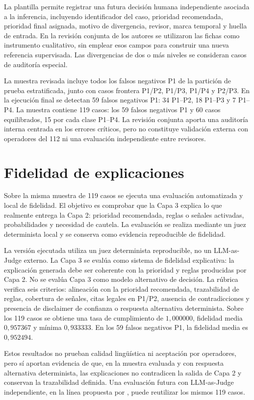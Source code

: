 La plantilla permite registrar una futura decisión humana independiente asociada a la inferencia,
incluyendo identificador del caso, prioridad recomendada, prioridad final asignada,
motivo de divergencia, revisor, marca temporal y huella de entrada. En la revisión conjunta de los autores se utilizaron las fichas como instrumento cualitativo, sin emplear esos campos para construir una nueva referencia supervisada. Las divergencias de dos o más niveles se consideran casos de auditoría especial.

La muestra revisada incluye todos los falsos negativos P1 de la
partición de prueba estratificada, junto con casos frontera P1/P2, P1/P3, P1/P4 y P2/P3. En la
ejecución final se detectan 59 falsos negativos P1: 34 P1--P2, 18 P1--P3 y 7 P1--P4.
La muestra contiene 119 casos: los 59 falsos negativos P1 y 60 casos equilibrados, 15 por cada clase P1--P4. La revisión conjunta aporta una auditoría interna centrada en los errores críticos, pero no constituye validación externa con operadores del 112 ni una evaluación independiente entre revisores.

\section{Fidelidad de explicaciones}

Sobre la misma muestra de 119 casos se ejecuta una evaluación automatizada y local
de fidelidad. El objetivo es comprobar que la Capa 3 explica
lo que realmente entrega la Capa 2: prioridad recomendada, reglas o señales activadas,
probabilidades y necesidad de cautela. La evaluación se realiza mediante un juez determinista local y se conserva como evidencia reproducible de fidelidad.

La versión ejecutada utiliza un juez determinista reproducible, no un LLM-as-Judge
externo. La Capa 3 se evalúa como sistema de fidelidad explicativa: la explicación
generada debe ser coherente con la prioridad y reglas producidas por Capa 2. No se
evalúa Capa 3 como modelo alternativo de decisión. La rúbrica verifica seis criterios:
alineación con la prioridad recomendada, trazabilidad de reglas, cobertura de señales,
citas legales en P1/P2, ausencia de contradicciones y presencia de disclaimer de
confianza o respuesta alternativa determinista. Sobre los 119 casos se obtiene una tasa de cumplimiento de
\(1{,}000000\), fidelidad media \(0{,}957367\) y mínima \(0{,}933333\). En los
59 falsos negativos P1, la fidelidad media es \(0{,}952494\).

Estos resultados no prueban calidad lingüística ni aceptación por operadores, pero sí
aportan evidencia de que, en la muestra evaluada y con respuesta alternativa determinista,
las explicaciones no contradicen la salida de Capa 2 y conservan la trazabilidad definida. Una
evaluación futura con LLM-as-Judge independiente, en la línea propuesta por
, puede reutilizar los mismos 119 casos.

